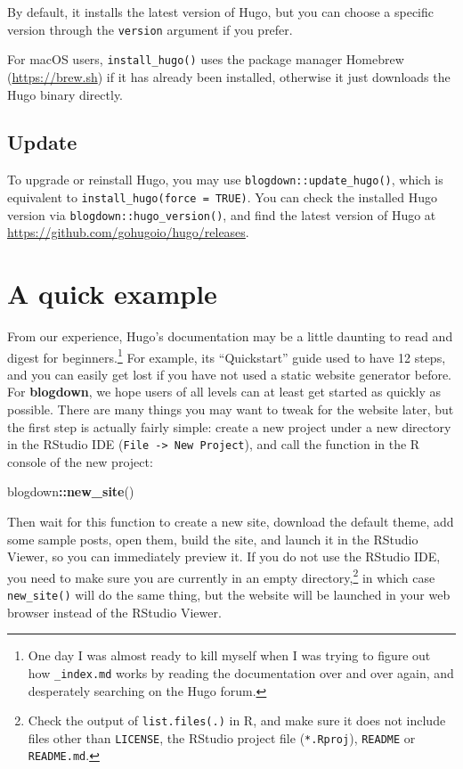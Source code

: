 \documentclass[12pt,]{krantz}
\makeatletter
\newenvironment{Shaded}{\begin{snugshade}}{\end{snugshade}}
\newcommand{\KeywordTok}[1]{\textcolor[rgb]{0.13,0.29,0.53}{\textbf{#1}}}
\newcommand{\OperatorTok}[1]{\textcolor[rgb]{0.81,0.36,0.00}{\textbf{#1}}}
\newcommand{\NormalTok}[1]{#1}
\newenvironment{kframe}{%
\medskip{}
\setlength{\fboxsep}{.8em}
 \def\at@end@of@kframe{}%
 \ifinner\ifhmode%
  \def\at@end@of@kframe{\end{minipage}}%
  \begin{minipage}{\columnwidth}%
 \fi\fi%
 \def\FrameCommand##1{\hskip\@totalleftmargin \hskip-\fboxsep
 \colorbox{shadecolor}{##1}\hskip-\fboxsep
     \hskip-\linewidth \hskip-\@totalleftmargin \hskip\columnwidth}%
 \MakeFramed {\advance\hsize-\width
   \@totalleftmargin\z@ \linewidth\hsize
   \@setminipage}}%
 {\par\unskip\endMakeFramed%
 \at@end@of@kframe}
\renewenvironment{Shaded}{\begin{kframe}}{\end{kframe}}
\theoremstyle{definition}
\theoremstyle{definition}
\theoremstyle{definition}
\theoremstyle{remark}
\makeatother
\begin{document}
By default, it installs the latest version of Hugo, but you can choose a
specific version through the \texttt{version} argument if you prefer.

For macOS users, \texttt{install\_hugo()} uses the package manager
Homebrew (\url{https://brew.sh}) if it has already been installed,
otherwise it just downloads the Hugo binary directly.

\subsection{Update}\label{update}

To upgrade or reinstall Hugo, you may use
\texttt{blogdown::update\_hugo()}, which is equivalent to
\texttt{install\_hugo(force\ =\ TRUE)}. You can check the installed Hugo
version via \texttt{blogdown::hugo\_version()}, and find the latest
version of Hugo at \url{https://github.com/gohugoio/hugo/releases}.

\section{A quick example}\label{a-quick-example}

From our experience, Hugo's documentation may be a little daunting to
read and digest for beginners.\footnote{One day I was almost ready to
  kill myself when I was trying to figure out how \texttt{\_index.md}
  works by reading the documentation over and over again, and
  desperately searching on the Hugo forum.} For example, its
``Quickstart'' guide used to have 12 steps, and you can easily get lost
if you have not used a static website generator before. For
\textbf{blogdown}, we hope users of all levels can at least get started
as quickly as possible. There are many things you may want to tweak for
the website later, but the first step is actually fairly simple: create
a new project under a new directory in the RStudio IDE
(\texttt{File\ -\textgreater{}\ New\ Project}), and call the function in
the R console of the new project:

\begin{Shaded}
\begin{Highlighting}[]
\NormalTok{blogdown}\OperatorTok{::}\KeywordTok{new_site}\NormalTok{()}
\end{Highlighting}
\end{Shaded}

Then wait for this function to create a new site, download the default
theme, add some sample posts, open them, build the site, and launch it
in the RStudio Viewer, so you can immediately preview it. If you do not
use the RStudio IDE, you need to make sure you are currently in an empty
directory,\footnote{Check the output of
  \texttt{list.files(\textquotesingle{}.\textquotesingle{})} in R, and
  make sure it does not include files other than \texttt{LICENSE}, the
  RStudio project file (\texttt{*.Rproj}), \texttt{README} or
  \texttt{README.md}.} in which case \texttt{new\_site()} will do the
same thing, but the website will be launched in your web browser instead
of the RStudio Viewer.
\end{document}
